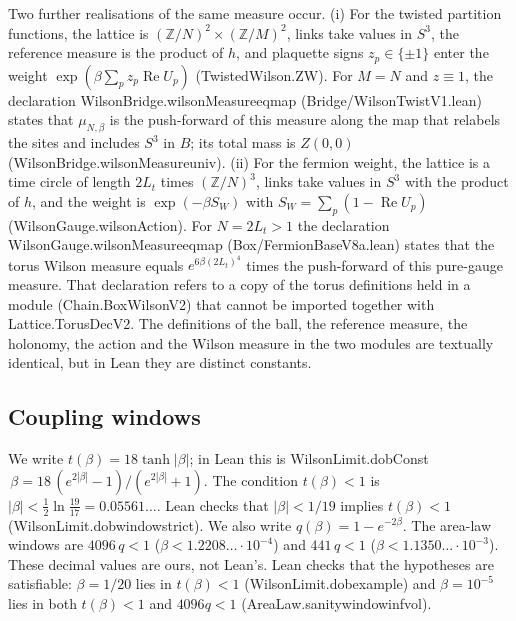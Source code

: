 \documentclass[11pt,a4paper]{article}
\theoremstyle{definition}
\theoremstyle{remark}
\newcommand{\leanus}{\textunderscore\allowbreak{}}
\newcommand{\leandot}{.\allowbreak{}}
\newcommand{\leansl}{/\allowbreak{}}
\newcommand{\lean}[1]{{\ttfamily\let\_\leanus #1}}
\newcommand{\Z}{\mathbb{Z}}
\renewcommand{\Re}{\operatorname{Re}}
\begin{document}
Two further realisations of the same measure occur. (i) For the twisted partition functions, the lattice is $(\Z/N)^2\times(\Z/M)^2$, links take values in $S^3$, the reference measure is the product of $h$, and plaquette signs $z_p\in\{\pm1\}$ enter the weight $\exp(\beta\sum_p z_p\Re U_p)$ (\lean{TwistedWilson\leandot{}ZW}). For $M=N$ and $z\equiv1$, the declaration \lean{WilsonBridge\leandot{}wilsonMeasure\_eq\_map} (\lean{Bridge\leansl{}WilsonTwistV1\leandot{}lean}) states that $\mu_{N,\beta}$ is the push-forward of this measure along the map that relabels the sites and includes $S^3$ in $B$; its total mass is $Z(0,0)$ (\lean{WilsonBridge\leandot{}wilsonMeasure\_univ}). (ii) For the fermion weight, the lattice is a time circle of length $2L_t$ times $(\Z/N)^3$, links take values in $S^3$ with the product of $h$, and the weight is $\exp(-\beta S_W)$ with $S_W=\sum_p(1-\Re U_p)$ (\lean{WilsonGauge\leandot{}wilsonAction}). For $N=2L_t>1$ the declaration \lean{WilsonGauge\leandot{}wilsonMeasure\_eq\_map} (\lean{Box\leansl{}FermionBaseV8a\leandot{}lean}) states that the torus Wilson measure equals $e^{6\beta(2L_t)^4}$ times the push-forward of this pure-gauge measure. That declaration refers to a copy of the torus definitions held in a module (\lean{Chain\leandot{}BoxWilsonV2}) that cannot be imported together with \lean{Lattice\leandot{}TorusDecV2}. The definitions of the ball, the reference measure, the holonomy, the action and the Wilson measure in the two modules are textually identical, but in Lean they are distinct constants.

\subsection{Coupling windows}

We write $t(\beta)=18\tanh|\beta|$; in Lean this is \lean{WilsonLimit\leandot{}dobConst}$\,\beta=18\,(e^{2|\beta|}-1)/(e^{2|\beta|}+1)$. The condition $t(\beta)<1$ is $|\beta|<\tfrac12\ln\tfrac{19}{17}=0.05561\ldots$. Lean checks that $|\beta|<1/19$ implies $t(\beta)<1$ (\lean{WilsonLimit\leandot{}dob\_window\_strict}). We also write $q(\beta)=1-e^{-2\beta}$. The area-law windows are $4096\,q<1$ ($\beta<1.2208\ldots\cdot10^{-4}$) and $441\,q<1$ ($\beta<1.1350\ldots\cdot10^{-3}$). These decimal values are ours, not Lean's. Lean checks that the hypotheses are satisfiable: $\beta=1/20$ lies in $t(\beta)<1$ (\lean{WilsonLimit\leandot{}dob\_example}) and $\beta=10^{-5}$ lies in both $t(\beta)<1$ and $4096q<1$ (\lean{AreaLaw\leandot{}sanity\_window\_infvol}).
\end{document}
